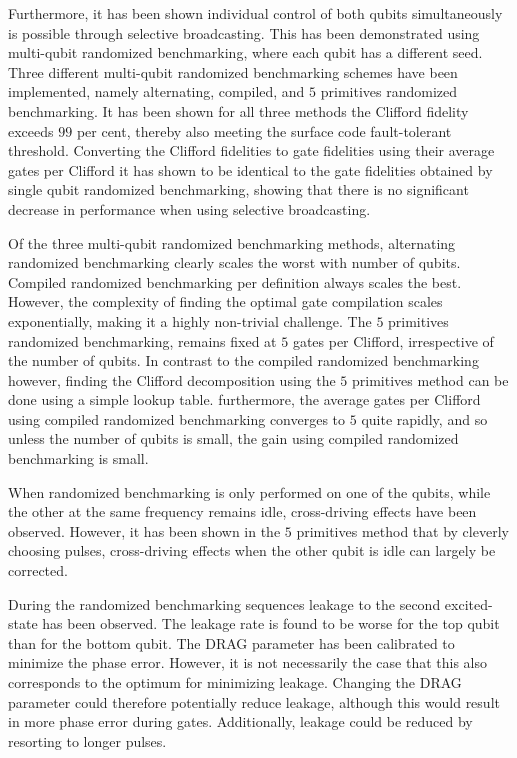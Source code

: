     Furthermore, it has been shown individual control of both qubits simultaneously is possible through selective broadcasting. This has been demonstrated using multi-qubit randomized benchmarking, where each qubit has a different seed. Three different multi-qubit randomized benchmarking schemes have been implemented, namely alternating, compiled, and $5$ primitives randomized benchmarking. It has been shown for all three methods the Clifford fidelity exceeds $99$ per cent, thereby also meeting the surface code fault-tolerant threshold. Converting the Clifford fidelities to gate fidelities using their average gates per Clifford it has shown to be identical to the gate fidelities obtained by single qubit randomized benchmarking, showing that there is no significant decrease in performance when using selective broadcasting.

    Of the three multi-qubit randomized benchmarking methods, alternating randomized benchmarking clearly scales the worst with number of qubits. Compiled randomized benchmarking per definition always scales the best. However, the complexity of finding the optimal gate compilation scales exponentially, making it a highly non-trivial challenge. The $5$ primitives randomized benchmarking, remains fixed at $5$ gates per Clifford, irrespective of the number of qubits. In contrast to the compiled randomized benchmarking however, finding the Clifford decomposition using the $5$ primitives method can be done using a simple lookup table. furthermore, the average gates per Clifford using compiled randomized benchmarking converges to $5$ quite rapidly, and so unless the number of qubits is small, the gain using compiled randomized benchmarking is small.

    When randomized benchmarking is only performed on one of the qubits, while the other at the same frequency remains idle, cross-driving effects have been observed. However, it has been shown in the $5$ primitives method that by cleverly choosing pulses, cross-driving effects when the other qubit is idle can largely be corrected.

    During the randomized benchmarking sequences leakage to the second excited-state has been observed. The leakage rate is found to be worse for the top qubit than for the bottom qubit. The DRAG parameter has been calibrated to minimize the phase error. However, it is not necessarily the case that this also corresponds to the optimum for minimizing leakage. Changing the DRAG parameter could therefore potentially reduce leakage, although this would result in more phase error during gates. Additionally, leakage could be reduced by resorting to longer pulses.

